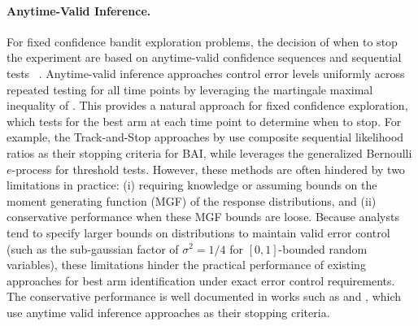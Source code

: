 \documentclass{article}
\begin{document}
\paragraph{Anytime-Valid Inference.} For fixed confidence bandit exploration problems, the decision of when to stop the experiment are based on anytime-valid confidence sequences and sequential tests ~\citep{garivier2016optimalbestarmidentification,kaufmann2021mixturemartingalesrevisitedapplications,cho2024rewardmaximizationpureexploration, cho2024peekingpeaksequentialnonparametric, Howard_2021}. Anytime-valid inference approaches control error levels uniformly across repeated testing for all time points by leveraging the martingale maximal inequality of \citet{Ville1939}. This provides a natural approach for fixed confidence exploration, which tests for the best arm at each time point to determine when to stop. For example, the Track-and-Stop approaches by \cite{garivier2016optimalbestarmidentification} use composite sequential likelihood ratios as their stopping criteria for BAI, while \cite{cho2024rewardmaximizationpureexploration} leverages the generalized Bernoulli $e$-process for threshold tests. However, these methods are often hindered by two limitations in practice: (i) requiring knowledge or assuming bounds on the moment generating function (MGF) of the response distributions, and (ii) conservative performance when these MGF bounds are loose. Because analysts tend to specify larger bounds on distributions to maintain valid error control (such as the sub-gaussian factor of $\sigma^2 = 1/4$ for $[0,1]$-bounded random variables), these limitations hinder the practical performance of existing approaches for best arm identification under exact error control requirements. The conservative performance is well documented in works such as \citet{garivier2016optimalbestarmidentification} and \citet{cho2024rewardmaximizationpureexploration}, which use anytime valid inference approaches as their stopping criteria.
\end{document}
